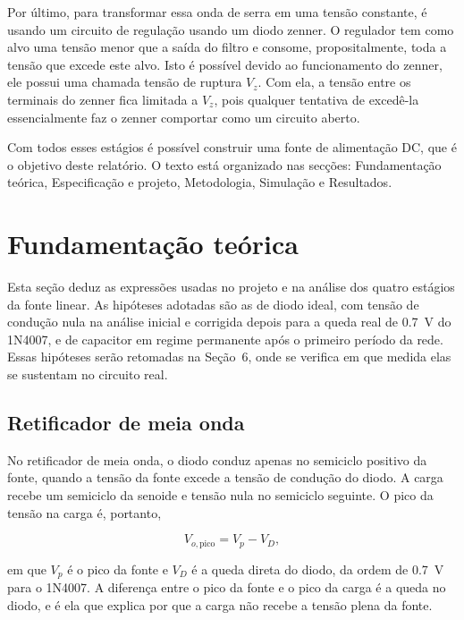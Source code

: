 \documentclass[11pt,a4paper]{article}
\begin{document}
Por último, para transformar essa onda de serra em uma tensão constante, é usando um circuito de
regulação usando um diodo zenner. O regulador tem como alvo uma tensão menor que a saída do filtro
e consome, propositalmente, toda a tensão que excede este alvo. Isto é possível devido ao funcionamento
do zenner, ele possui uma chamada tensão de ruptura $V_z$. Com ela, a tensão entre os terminais do
zenner fica limitada a $V_z$, pois qualquer tentativa de excedê-la essencialmente faz o zenner
comportar como um circuito aberto.

Com todos esses estágios é possível construir uma fonte de alimentação DC, que é o objetivo deste relatório.
O texto está organizado nas secções: Fundamentação teórica, Especificação e projeto, Metodologia, Simulação e Resultados.

\section{Fundamentação teórica}

Esta seção deduz as expressões usadas no projeto e na análise dos quatro estágios da fonte linear. As hipóteses adotadas são as de diodo ideal, com tensão de condução nula na análise inicial e corrigida depois para a queda real de \SI{0,7}{\volt} do 1N4007, e de capacitor em regime permanente após o primeiro período da rede. Essas hipóteses serão retomadas na Seção~6, onde se verifica em que medida elas se sustentam no circuito real.
 
\subsection{Retificador de meia onda}
 
No retificador de meia onda, o diodo conduz apenas no semiciclo positivo da fonte, quando a tensão da fonte excede a tensão de condução do diodo. A carga recebe um semiciclo da senoide e tensão nula no semiciclo seguinte. O pico da tensão na carga é, portanto,
 
\begin{equation}
V_{o,\text{pico}} = V_p - V_D ,
\label{eq:meia_onda_pico}
\end{equation}
 
em que \(V_p\) é o pico da fonte e \(V_D\) é a queda direta do diodo, da ordem de \SI{0,7}{\volt} para o 1N4007. A diferença entre o pico da fonte e o pico da carga é a queda no diodo, e é ela que explica por que a carga não recebe a tensão plena da fonte.
 
\end{document}
